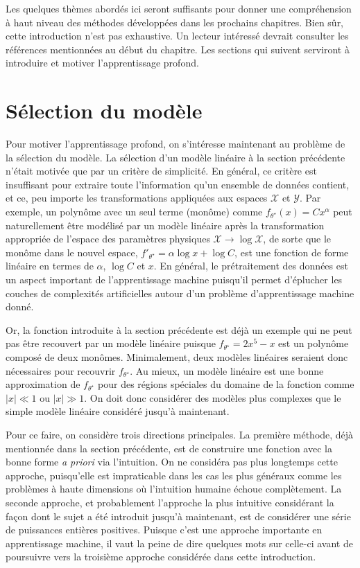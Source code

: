 Les quelques thèmes abordés ici seront suffisants
pour donner une compréhension à haut niveau des méthodes développées dans les prochains chapitres. Bien sûr, 
cette introduction n'est pas exhaustive. Un lecteur intéressé devrait consulter les références mentionnées au début du 
chapitre. Les sections qui suivent serviront à introduire et motiver l'apprentissage profond.


\section{Sélection du modèle}\label{sec:selection modele}

Pour motiver l'apprentissage profond, on s'intéresse maintenant au problème de la sélection du modèle. 
La sélection d'un modèle linéaire à la section précédente n'était motivée que par un critère de simplicité. En général, 
ce critère est insuffisant pour extraire toute l'information qu'un ensemble de données contient, et ce, peu importe les transformations appliquées 
aux espaces $\mathcal{X}$ et $\mathcal{Y}$. Par exemple, un polynôme avec un seul terme (monôme) comme $f_{\theta^{\star}}(x) = Cx^{\alpha}$ peut naturellement être modélisé 
par un modèle linéaire après la transformation appropriée de l'espace des paramètres physiques $\mathcal{X} \rightarrow  \log \mathcal{X}$, de sorte 
que le monôme dans le nouvel espace, $f'_{\theta^{\star}} = \alpha \log x + \log C$, est une fonction de forme linéaire en termes de $\alpha$, $\log C$ et $x$.
En général, le prétraitement des données est un aspect important de l'apprentissage machine puisqu'il permet d'éplucher les couches 
de complexités artificielles autour d'un problème d'apprentissage machine donné.

Or, la fonction introduite à la section précédente est déjà un exemple qui ne peut pas être recouvert par un modèle linéaire puisque 
$f_{\theta^{\star}} = 2x^{5} - x$ est un polynôme composé de deux monômes. Minimalement, deux modèles linéaires seraient donc nécessaires pour recouvrir $f_{\theta^{\star}}$.
Au mieux, un modèle linéaire est une bonne approximation de $f_{\theta^{\star}}$ pour des régions spéciales du domaine de la fonction comme $|x| \ll 1$ ou $|x| \gg 1$.
On doit donc considérer des modèles plus complexes que le simple modèle linéaire considéré jusqu'à maintenant.

Pour ce faire, on considère trois directions principales. 
La première méthode, déjà mentionnée dans la section précédente, est de construire une fonction avec la bonne forme \textit{a priori} via l'intuition.  
On ne considéra pas plus longtemps cette approche, puisqu'elle est impraticable dans les cas les plus généraux comme les problèmes à haute dimensions où l'intuition humaine échoue complètement.
La seconde approche, et probablement l'approche la plus intuitive considérant la façon dont le sujet a été introduit jusqu'à maintenant, est de considérer une série de puissances entières positives.
Puisque c'est une approche importante en apprentissage machine, il vaut la peine de dire quelques mots sur celle-ci avant de poursuivre vers la troisième approche considérée dans cette introduction. 

